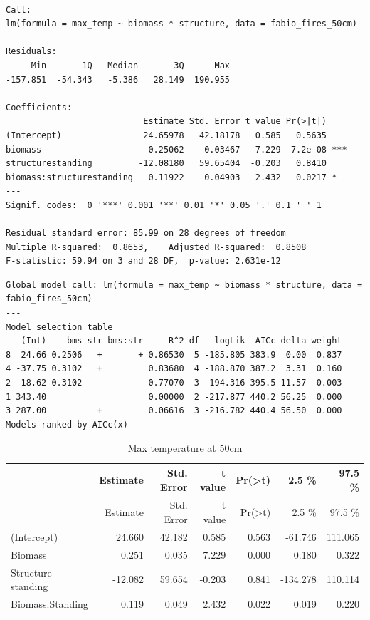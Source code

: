 \documentclass[11pt,a4paper]{article}
\begin{document}
\begin{verbatim}

Call:
lm(formula = max_temp ~ biomass * structure, data = fabio_fires_50cm)

Residuals:
     Min       1Q   Median       3Q      Max 
-157.851  -54.343   -5.386   28.149  190.955 

Coefficients:
                           Estimate Std. Error t value Pr(>|t|)    
(Intercept)                24.65978   42.18178   0.585   0.5635    
biomass                     0.25062    0.03467   7.229  7.2e-08 ***
structurestanding         -12.08180   59.65404  -0.203   0.8410    
biomass:structurestanding   0.11922    0.04903   2.432   0.0217 *  
---
Signif. codes:  0 '***' 0.001 '**' 0.01 '*' 0.05 '.' 0.1 ' ' 1

Residual standard error: 85.99 on 28 degrees of freedom
Multiple R-squared:  0.8653,    Adjusted R-squared:  0.8508 
F-statistic: 59.94 on 3 and 28 DF,  p-value: 2.631e-12
\end{verbatim}

\begin{verbatim}
Global model call: lm(formula = max_temp ~ biomass * structure, data = fabio_fires_50cm)
---
Model selection table 
   (Int)    bms str bms:str     R^2 df   logLik  AICc delta weight
8  24.66 0.2506   +       + 0.86530  5 -185.805 383.9  0.00  0.837
4 -37.75 0.3102   +         0.83680  4 -188.870 387.2  3.31  0.160
2  18.62 0.3102             0.77070  3 -194.316 395.5 11.57  0.003
1 343.40                    0.00000  2 -217.877 440.2 56.25  0.000
3 287.00          +         0.06616  3 -216.782 440.4 56.50  0.000
Models ranked by AICc(x) 
\end{verbatim}

\begin{longtable}[]{@{}lrrrrrr@{}}
\caption{Max temperature at 50cm}\tabularnewline
\toprule
& Estimate & Std. Error & t value &
Pr(\textgreater{}\textbar{}t\textbar{}) & 2.5 \% & 97.5
\%\tabularnewline
\midrule
\endfirsthead
\toprule
& Estimate & Std. Error & t value &
Pr(\textgreater{}\textbar{}t\textbar{}) & 2.5 \% & 97.5
\%\tabularnewline
\midrule
\endhead
(Intercept) & 24.660 & 42.182 & 0.585 & 0.563 & -61.746 &
111.065\tabularnewline
Biomass & 0.251 & 0.035 & 7.229 & 0.000 & 0.180 & 0.322\tabularnewline
Structure-standing & -12.082 & 59.654 & -0.203 & 0.841 & -134.278 &
110.114\tabularnewline
Biomass:Standing & 0.119 & 0.049 & 2.432 & 0.022 & 0.019 &
0.220\tabularnewline
\bottomrule
\end{longtable}
\end{document}
